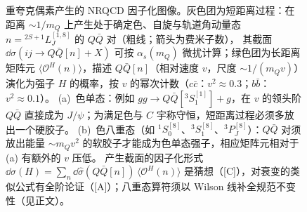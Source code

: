 \begin{figure}[htbp]
\caption{重夸克偶素产生的 NRQCD 因子化图像。灰色团为短距离过程：在距离 $\sim1/m_Q$ 上产生处于确定色、自旋与轨道角动量态 $n={}^{2S+1}L_J^{[1,8]}$ 的 $Q\bar Q$ 对（粗线；箭头为费米子数），
其截面 $\dd\hat\sigma(ij\to Q\bar Q[n]+X)$ 可按 $\alpha_s(m_Q)$ 微扰计算；绿色团为长距离矩阵元 $\langle\mathcal O^{H}(n)\rangle$，描述 $Q\bar Q[n]$（相对速度 $v$，尺度 $\sim1/(m_Qv)$）演化为强子 $H$ 的概率，按 $v$ 的幂次计数（$c\bar c$：$v^2\approx0.3$；$b\bar b$：$v^2\approx0.1$）。
(a)~色单态：例如 $gg\to Q\bar Q[{}^3S_1^{[1]}]+g$，在 $v$ 的领头阶 $Q\bar Q$ 直接成为 $J/\psi$；为满足色与 $C$ 宇称守恒，短距离过程必须多放出一个硬胶子。
(b)~色八重态（如 ${}^1S_0^{[8]}$、${}^3S_1^{[8]}$、${}^3P_J^{[8]}$）：$Q\bar Q$ 对须放出能量 $\sim m_Qv^2$ 的软胶子才能成为色单态强子，相应矩阵元相对于 (a) 有额外的 $v$ 压低。
产生截面的因子化形式 $\dd\sigma(H)=\sum_n\dd\hat\sigma(Q\bar Q[n])\,\langle\mathcal O^H(n)\rangle$ 是猜想（[C]），对衰变的类似公式有全阶论证（[A]）；八重态算符须以 Wilson 线补全规范不变性（见正文）。}
\label{fig:nrqcd}
\end{figure}

